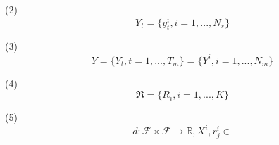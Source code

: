 (2)
\begin{equation}
  Y_t = \{y_t^i, i = 1, ..., N_s\}
\end{equation}

(3)
\begin{equation}
  Y = \{Y_t, t = 1, ..., T_m\} = \{Y^i, i = 1, ..., N_m\}
\end{equation}

(4)
\begin{equation}
  \Re = \{R_i, i = 1, ..., K\}
\end{equation}


(5)
\begin{equation}
  d: \mathcal{F} \times \mathcal{F} \rightarrow \mathbb{R},    X^i , r_j^i \in 
\end{equation}